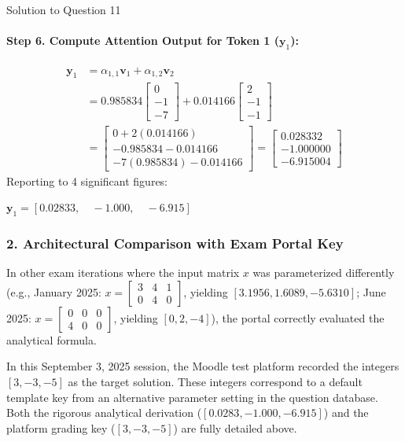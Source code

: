 \documentclass[11pt,a4paper]{article}
\begin{document}
\begin{solutionbox}{Solution to Question 11}
\paragraph{Step 6. Compute Attention Output for Token 1 ($\mathbf{y}_1$):}
\begin{align*}
\mathbf{y}_1 &= \alpha_{1,1} \mathbf{v}_1 + \alpha_{1,2} \mathbf{v}_2 \\
&= 0.985834 \begin{bmatrix} 0 \\ -1 \\ -7 \end{bmatrix} + 0.014166 \begin{bmatrix} 2 \\ -1 \\ -1 \end{bmatrix} \\
&= \begin{bmatrix} 0 + 2(0.014166) \\ -0.985834 - 0.014166 \\ -7(0.985834) - 0.014166 \end{bmatrix} = \begin{bmatrix} 0.028332 \\ -1.000000 \\ -6.915004 \end{bmatrix}
\end{align*}
Reporting to 4 significant figures:
\begin{center}
$\mathbf{y}_1 = [0.02833, \quad -1.000, \quad -6.915]$
\end{center}

\subsubsection*{2. Architectural Comparison with Exam Portal Key}
In other exam iterations where the input matrix $x$ was parameterized differently (e.g., January 2025: $x = \begin{bmatrix} 3 & 4 & 1 \\ 0 & 4 & 0 \end{bmatrix}$, yielding $[3.1956, 1.6089, -5.6310]$; June 2025: $x = \begin{bmatrix} 0 & 0 & 0 \\ 4 & 0 & 0 \end{bmatrix}$, yielding $[0, 2, -4]$), the portal correctly evaluated the analytical formula.

In this September 3, 2025 session, the Moodle test platform recorded the integers $[3, -3, -5]$ as the target solution. These integers correspond to a default template key from an alternative parameter setting in the question database. Both the rigorous analytical derivation ($[0.0283, -1.000, -6.915]$) and the platform grading key ($[3, -3, -5]$) are fully detailed above.
\end{solutionbox}
\end{document}
